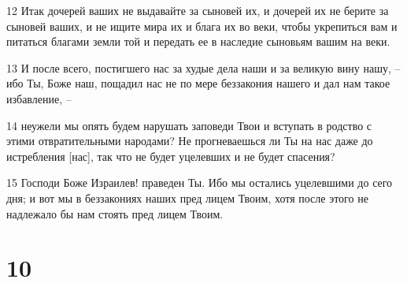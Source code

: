 \par 12 Итак дочерей ваших не выдавайте за сыновей их, и дочерей их не берите за сыновей ваших, и не ищите мира их и блага их во веки, чтобы укрепиться вам и питаться благами земли той и передать ее в наследие сыновьям вашим на веки.
\par 13 И после всего, постигшего нас за худые дела наши и за великую вину нашу, --ибо Ты, Боже наш, пощадил нас не по мере беззакония нашего и дал нам такое избавление, --
\par 14 неужели мы опять будем нарушать заповеди Твои и вступать в родство с этими отвратительными народами? Не прогневаешься ли Ты на нас даже до истребления [нас], так что не будет уцелевших и не будет спасения?
\par 15 Господи Боже Израилев! праведен Ты. Ибо мы остались уцелевшими до сего дня; и вот мы в беззакониях наших пред лицем Твоим, хотя после этого не надлежало бы нам стоять пред лицем Твоим.

\chapter{10}

